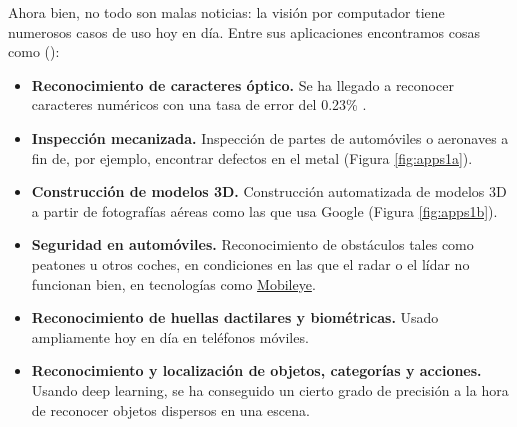 Ahora bien, no todo son malas noticias: la visión por computador tiene numerosos casos de uso hoy en día. Entre sus aplicaciones encontramos cosas como (\citeauthor*{book:szeliski}):
\begin{itemize}
\item \textbf{Reconocimiento de caracteres óptico.} Se ha llegado a reconocer caracteres numéricos con una tasa de error del 0.23\% \cite{art:2012arXiv1202.2745C}.
\item \textbf{Inspección mecanizada.} Inspección de partes de automóviles o aeronaves a fin de, por ejemplo, encontrar defectos en el metal (Figura \ref{fig:apps1a}).
\item \textbf{Construcción de modelos 3D.} Construcción automatizada de modelos 3D a partir de fotografías aéreas como las que usa Google 
 (Figura \ref{fig:apps1b}).
\item \textbf{Seguridad en automóviles.} Reconocimiento de obstáculos tales como peatones u otros coches, en condiciones en las que el radar o el lídar no funcionan bien, en tecnologías como \href{https://www.mobileye.com/}{Mobileye}.
\item \textbf{Reconocimiento de huellas dactilares y biométricas.} Usado ampliamente hoy en día en teléfonos móviles.
\item \textbf{Reconocimiento y localización de objetos, categorías y acciones.} Usando deep learning, se ha conseguido un cierto grado de precisión a la hora de reconocer objetos dispersos en una escena.
\end{itemize}

